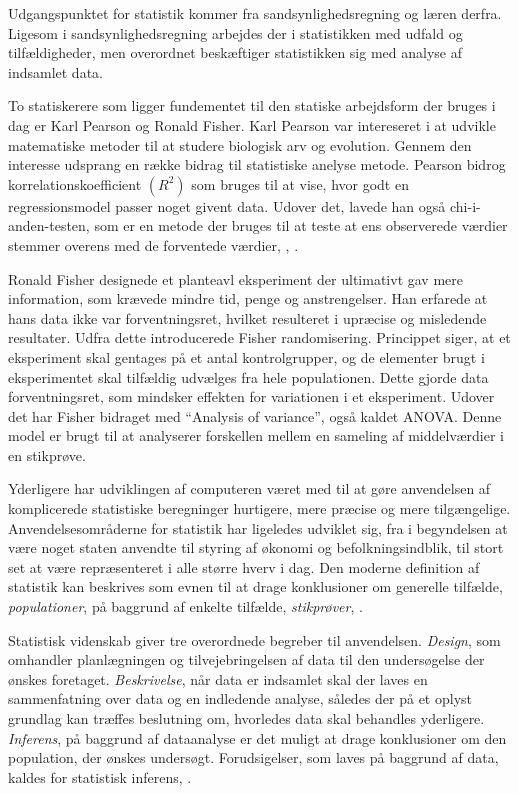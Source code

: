 \documentclass[
]{book}
\theoremstyle{definition}
\theoremstyle{definition}
\theoremstyle{definition}
\theoremstyle{remark}
\begin{document}
Udgangspunktet for statistik kommer fra sandsynlighedsregning og læren derfra. Ligesom i sandsynlighedsregning arbejdes der i statistikken med udfald og tilfældigheder, men overordnet beskæftiger statistikken sig med analyse af indsamlet data.

To statiskerere som ligger fundementet til den statiske arbejdsform der bruges i dag er Karl Pearson og Ronald Fisher.
Karl Pearson var intereseret i at udvikle matematiske metoder til at studere biologisk arv og evolution. Gennem den interesse udsprang en række bidrag til statistiske anelyse metode. Pearson bidrog korrelationskoefficient \((R^2)\) som bruges til at vise, hvor godt en regressionsmodel passer noget givent data. Udover det, lavede han også chi-i-anden-testen, som er en metode der bruges til at teste at ens observerede værdier stemmer overens med de forventede værdier, \citep{KarlPearsonbrit}, \citep{Chiianden}.

Ronald Fisher designede et planteavl eksperiment der ultimativt gav mere information, som krævede mindre tid, penge og anstrengelser. Han erfarede at hans data ikke var forventningsret, hvilket resulteret i upræcise og misledende resultater. Udfra dette introducerede Fisher randomisering. Princippet siger, at et eksperiment skal gentages på et antal kontrolgrupper, og de elementer brugt i eksperimentet skal tilfældig udvælges fra hele populationen. Dette gjorde data forventningsret, som mindsker effekten for variationen i et eksperiment. Udover det har Fisher bidraget med ``Analysis of variance'', også kaldet ANOVA. Denne model er brugt til at analyserer forskellen mellem en sameling af middelværdier i en stikprøve.
\citep{RonaldFisher}

Yderligere har udviklingen af computeren været med til at gøre anvendelsen af komplicerede statistiske beregninger hurtigere, mere præcise og mere tilgængelige. Anvendelsesområderne for statistik har ligeledes udviklet sig, fra i begyndelsen at være noget staten anvendte til styring af økonomi og befolkningsindblik, til stort set at være repræsenteret i alle større hverv i dag. Den moderne definition af statistik kan beskrives som evnen til at drage konklusioner om generelle tilfælde, \emph{populationer}, på baggrund af enkelte tilfælde, \emph{stikprøver}, \citep[s. 1]{ASTAbog}.

Statistisk videnskab giver tre overordnede begreber til anvendelsen. \emph{Design}, som omhandler planlægningen og tilvejebringelsen af data til den undersøgelse der ønskes foretaget. \emph{Beskrivelse}, når data er indsamlet skal der laves en sammenfatning over data og en indledende analyse, således der på et oplyst grundlag kan træffes beslutning om, hvorledes data skal behandles yderligere. \emph{Inferens}, på baggrund af dataanalyse er det muligt at drage konklusioner om den population, der ønskes undersøgt. Forudsigelser, som laves på baggrund af data, kaldes for statistisk inferens, \citep[s. 15-16]{ASTAbog}.
\end{document}
